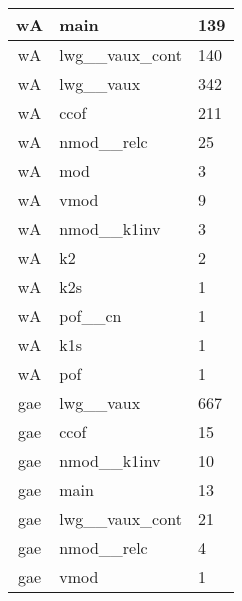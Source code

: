 \documentclass[a4 paper]{article}
\begin{document}
\begin{longtable}{cp{}p{}}
wA & main & 139\\ \midrule wA & lwg\_\_vaux\_cont & 140\\ \midrule wA & lwg\_\_vaux & 342\\ \midrule wA & ccof & 211\\ \midrule wA & nmod\_\_relc & 25\\ \midrule wA & mod & 3\\ \midrule wA & vmod & 9\\ \midrule wA & nmod\_\_k1inv & 3\\ \midrule wA & k2 & 2\\ \midrule wA & k2s & 1\\ \midrule wA & pof\_\_cn & 1\\ \midrule wA & k1s & 1\\ \midrule wA & pof & 1\\ \midrule 
gae & lwg\_\_vaux & 667\\ \midrule gae & ccof & 15\\ \midrule gae & nmod\_\_k1inv & 10\\ \midrule gae & main & 13\\ \midrule gae & lwg\_\_vaux\_cont & 21\\ \midrule gae & nmod\_\_relc & 4\\ \midrule gae & vmod & 1\\ \midrule 

\end{longtable}
\end{document}
